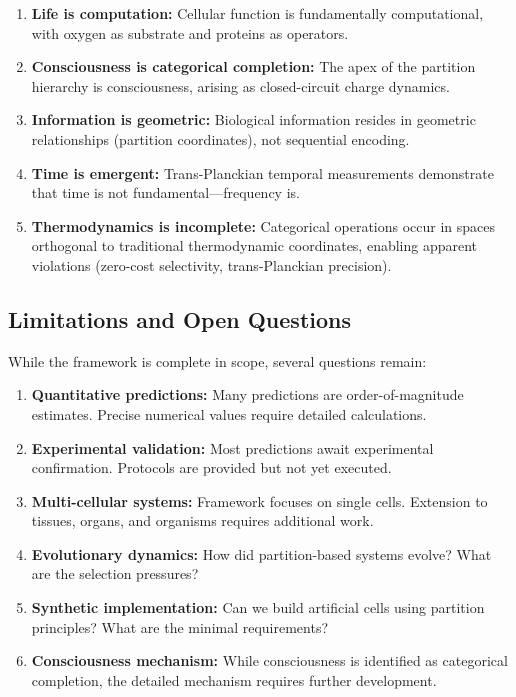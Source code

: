 \documentclass[12pt,a4paper]{article}
\begin{document}
\begin{enumerate}
\item \textbf{Life is computation:} Cellular function is fundamentally computational, with oxygen as substrate and proteins as operators.

\item \textbf{Consciousness is categorical completion:} The apex of the partition hierarchy is consciousness, arising as closed-circuit charge dynamics.

\item \textbf{Information is geometric:} Biological information resides in geometric relationships (partition coordinates), not sequential encoding.

\item \textbf{Time is emergent:} Trans-Planckian temporal measurements demonstrate that time is not fundamental—frequency is.

\item \textbf{Thermodynamics is incomplete:} Categorical operations occur in spaces orthogonal to traditional thermodynamic coordinates, enabling apparent violations (zero-cost selectivity, trans-Planckian precision).
\end{enumerate}

\subsection{Limitations and Open Questions}

While the framework is complete in scope, several questions remain:

\begin{enumerate}
\item \textbf{Quantitative predictions:} Many predictions are order-of-magnitude estimates. Precise numerical values require detailed calculations.

\item \textbf{Experimental validation:} Most predictions await experimental confirmation. Protocols are provided but not yet executed.

\item \textbf{Multi-cellular systems:} Framework focuses on single cells. Extension to tissues, organs, and organisms requires additional work.

\item \textbf{Evolutionary dynamics:} How did partition-based systems evolve? What are the selection pressures?

\item \textbf{Synthetic implementation:} Can we build artificial cells using partition principles? What are the minimal requirements?

\item \textbf{Consciousness mechanism:} While consciousness is identified as categorical completion, the detailed mechanism requires further development.
\end{enumerate}
\end{document}
